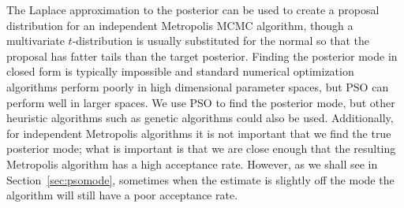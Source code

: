 \documentclass[12pt]{article}
\begin{document}
The Laplace approximation to the posterior can be used to create a proposal distribution for an independent Metropolis MCMC algorithm, though a multivariate $t$-distribution is usually substituted for the normal so that the proposal has fatter tails than the target posterior.  Finding the posterior mode in closed form is typically impossible and standard numerical optimization algorithms perform poorly in high dimensional parameter spaces, but PSO can perform well in larger spaces. We use PSO to find the posterior mode, but other heuristic algorithms such as genetic algorithms \citep{goldberg1988genetic} could also be used. Additionally, for independent Metropolis algorithms it is not important that we find the true posterior mode; what is important is that we are close enough that the resulting Metropolis algorithm has a high acceptance rate. However, as we shall see in Section~\ref{sec:psomode}, sometimes when the estimate is slightly off the mode the algorithm will still have a poor acceptance rate. 
\end{document}

